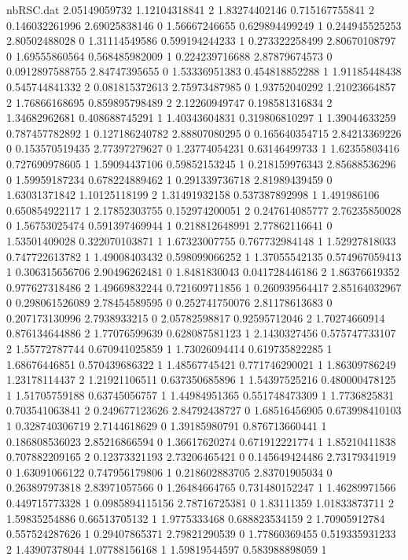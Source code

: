 \begin{filecontents}{nbRSC.dat}
2.05149059732 1.12104318841 2
1.83274402146 0.715167755841 2
0.146032261996 2.69025838146 0
1.56667246655 0.629894499249 1
0.244945525253 2.80502488028 0
1.31114549586 0.599194244233 1
0.273322258499 2.80670108797 0
1.69555860564 0.568485982009 1
0.224239716688 2.87879674573 0
0.0912897588755 2.84747395655 0
1.53336951383 0.454818852288 1
1.91185448438 0.545744841332 2
0.081815372613 2.75973487985 0
1.93752040292 1.21023664857 2
1.76866168695 0.859895798489 2
2.12260949747 0.198581316834 2
1.34682962681 0.408688745291 1
1.40343604831 0.319806810297 1
1.39044633259 0.787457782892 1
0.127186240782 2.88807080295 0
0.165640354715 2.84213369226 0
0.153570519435 2.77397279627 0
1.23774054231 0.63146499733 1
1.62355803416 0.727690978605 1
1.59094437106 0.59852153245 1
0.218159976343 2.85688536296 0
1.59959187234 0.678224889462 1
0.291339736718 2.81989439459 0
1.63031371842 1.10125118199 2
1.31491932158 0.537387892998 1
1.491986106 0.650854922117 1
2.17852303755 0.152974200051 2
0.247614085777 2.76235850028 0
1.56753025474 0.591397469944 1
0.218812648991 2.77862116641 0
1.53501409028 0.322070103871 1
1.67323007755 0.767732984148 1
1.52927818033 0.747722613782 1
1.49008403432 0.598099066252 1
1.37055542135 0.574967059413 1
0.306315656706 2.90496262481 0
1.8481830043 0.041728446186 2
1.86376619352 0.977627318486 2
1.49669832244 0.721609711856 1
0.260939564417 2.85164032967 0
0.298061526089 2.78454589595 0
0.252741750076 2.81178613683 0
0.207173130996 2.7938933215 0
2.05782598817 0.92595712046 2
1.70274660914 0.876134644886 2
1.77076599639 0.628087581123 1
2.1430327456 0.575747733107 2
1.55772787744 0.670941025859 1
1.73026094414 0.619735822285 1
1.68676446851 0.570439686322 1
1.48567745421 0.771746290021 1
1.86309786249 1.23178114437 2
1.21921106511 0.637350685896 1
1.54397525216 0.480000478125 1
1.51705759188 0.63745056757 1
1.44984951365 0.551748473309 1
1.7736825831 0.703541063841 2
0.249677123626 2.84792438727 0
1.68516456905 0.673998410103 1
0.328740306719 2.7144618629 0
1.39185980791 0.876713660441 1
0.186808536023 2.85216866594 0
1.36617620274 0.671912221774 1
1.85210411838 0.707882209165 2
0.12373321193 2.73206465421 0
0.145649424486 2.73179341919 0
1.63091066122 0.747956179806 1
0.218602883705 2.83701905034 0
0.263897973818 2.83971057566 0
1.26484664765 0.731480152247 1
1.46289971566 0.449715773328 1
0.0985894115156 2.78716725381 0
1.83111359 1.01833873711 2
1.59835254886 0.66513705132 1
1.9775333468 0.688823534159 2
1.70905912784 0.557524287626 1
0.29407865371 2.79821290539 0
1.77860369455 0.519335931233 2
1.43907378044 1.07788156168 1
1.59819544597 0.583988898059 1

\end{filecontents}
